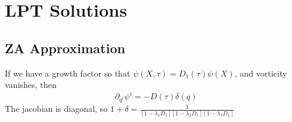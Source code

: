 \section{LPT Solutions}
\subsection{ZA Approximation}
If we have a growth factor so that $\psi(X,\tau)= D_1(\tau)\psi(X)$, and vorticity vanishes, then 
\begin{equation}
	\partial_{q^i} \psi^i = -D(\tau) \delta(q)
\end{equation}
The jacobian is diagonal, so
$1+\delta = \frac{1}{[1-\lambda_1D_1][1-\lambda_2D_1][1-\lambda_3D_1]}$












